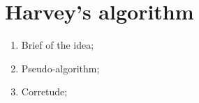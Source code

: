 \chapter{Harvey's algorithm}
\begin{enumerate}
    \item Brief of the idea;
    \item Pseudo-algorithm;
    \item Corretude;
\end{enumerate}